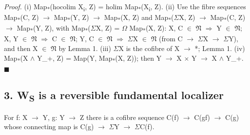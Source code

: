 \emph{Proof.} (i) Map\textsubscript{*}(hocolim X\textsubscript{i}, Z) = holim Map\textsubscript{*}(X\textsubscript{i}, Z). (ii) Use the fibre sequences Map\textsubscript{*}(C, Z) \ensuremath{\to} Map\textsubscript{*}(Y, Z) \ensuremath{\to} Map\textsubscript{*}(X, Z) and Map\textsubscript{*}(\ensuremath{\Sigma}X, Z) \ensuremath{\to} Map\textsubscript{*}(C, Z) \ensuremath{\to} Map\textsubscript{*}(Y, Z), with Map\textsubscript{*}(\ensuremath{\Sigma}X, Z) = \ensuremath{\Omega} Map\textsubscript{*}(X, Z): X, C \ensuremath{\in} \ensuremath{\mathfrak N} \ensuremath{\Rightarrow} Y \ensuremath{\in} \ensuremath{\mathfrak N}; X, Y \ensuremath{\in} \ensuremath{\mathfrak N} \ensuremath{\Rightarrow} C \ensuremath{\in} \ensuremath{\mathfrak N}; Y, C \ensuremath{\in} \ensuremath{\mathfrak N} \ensuremath{\Rightarrow} \ensuremath{\Sigma}X \ensuremath{\in} \ensuremath{\mathfrak N} (from C \ensuremath{\to} \ensuremath{\Sigma}X \ensuremath{\to} \ensuremath{\Sigma}Y), and then X \ensuremath{\in} \ensuremath{\mathfrak N} by Lemma 1. (iii) \ensuremath{\Sigma}X is the cofibre of X \ensuremath{\to} *; Lemma 1. (iv) Map\textsubscript{*}(X \ensuremath{\wedge} Y\_+, Z) = Map(Y, Map\textsubscript{*}(X, Z)); then Y \ensuremath{\to} X \ensuremath{\times} Y \ensuremath{\to} X \ensuremath{\wedge} Y\_+. \ensuremath{\blacksquare}

\subsection*{3. W\textsubscript{S} is a reversible fundamental localizer}

For f: X \ensuremath{\to} Y, g: Y \ensuremath{\to} Z there is a cofibre sequence C(f) \ensuremath{\to} C(gf) \ensuremath{\to} C(g) whose connecting map is C(g) \ensuremath{\to} \ensuremath{\Sigma}Y \ensuremath{\to} \ensuremath{\Sigma}C(f).

